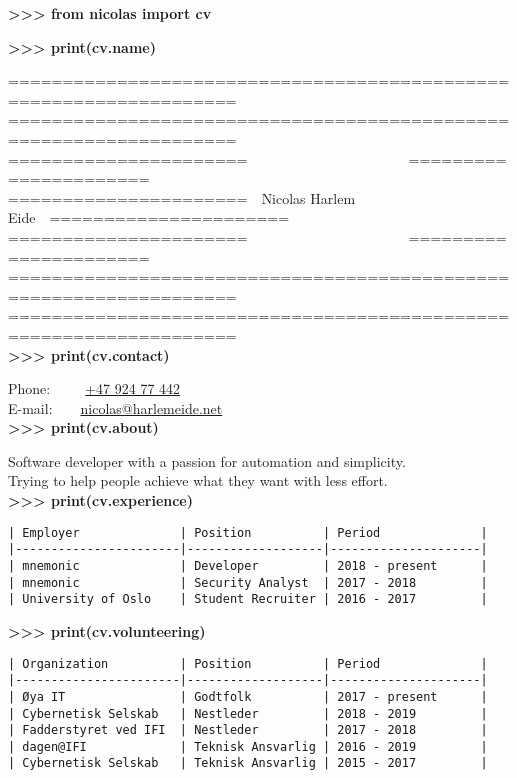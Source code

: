 \documentclass{minimal}
\newcommand{\keyword}[1]{\textcolor{keyword}{#1}}
\newcommand{\repl}[1]{\textbf{\textcolor{repl}{>{}>{}>} #1 \\}}
\begin{document}
    \repl{\keyword{from} nicolas \keyword{import} cv}

    \repl{\keyword{print}(cv.name)}

    =================================================================== \\
    =================================================================== \\
    ======================~~~~~~~~~~~~~~~~~~~~~~~====================== \\
    ======================~~\keyword{Nicolas Harlem Eide}~~====================== \\
    ======================~~~~~~~~~~~~~~~~~~~~~~~====================== \\
    =================================================================== \\
    =================================================================== \\

    \repl{\keyword{print}(cv.contact)}

    Phone:~~~~~\href{tel:+4792477442}{+47 924 77 442} \\
    E-mail:~~~~\href{mailto:nicolas@harlemeide.net}{nicolas@harlemeide.net} \\

    \repl{\keyword{print}(cv.about)}

    Software developer with a passion for automation and simplicity. \\
    Trying to help people achieve what they want with less effort. \\

    \repl{\keyword{print}(cv.experience)}

    \begin{verbatim}
| Employer              | Position          | Period              |
|-----------------------|-------------------|---------------------|
| mnemonic              | Developer         | 2018 - present      |
| mnemonic              | Security Analyst  | 2017 - 2018         |
| University of Oslo    | Student Recruiter | 2016 - 2017         |
    \end{verbatim}

    \repl{\keyword{print}(cv.volunteering)}

    \begin{verbatim}
| Organization          | Position          | Period              |
|-----------------------|-------------------|---------------------|
| Øya IT                | Godtfolk          | 2017 - present      |
| Cybernetisk Selskab   | Nestleder         | 2018 - 2019         |
| Fadderstyret ved IFI  | Nestleder         | 2017 - 2018         |
| dagen@IFI             | Teknisk Ansvarlig | 2016 - 2019         |
| Cybernetisk Selskab   | Teknisk Ansvarlig | 2015 - 2017         |
    \end{verbatim}
\end{document}
